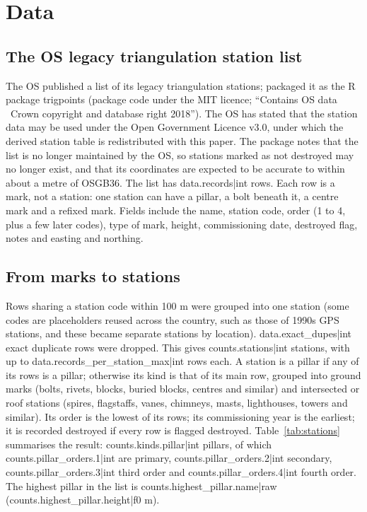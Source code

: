 \documentclass[11pt,a4paper]{article}
\begin{document}
\section{Data}\label{sec:data}
\subsection{The OS legacy triangulation station list}
The OS published a list of its legacy triangulation stations; \citet{jones2018} packaged it as the R package trigpoints (package code under the MIT licence; ``Contains OS data \textcopyright\ Crown copyright and database right 2018''). The OS has stated that the station data may be used under the Open Government Licence v3.0, under which the derived station table is redistributed with this paper. The package notes that the list is no longer maintained by the OS, so stations marked as not destroyed may no longer exist, and that its coordinates are expected to be accurate to within about a metre of OSGB36. The list has {{data.records|int}} rows. Each row is a mark, not a station: one station can have a pillar, a bolt beneath it, a centre mark and a refixed mark. Fields include the name, station code, order (1 to 4, plus a few later codes), type of mark, height, commissioning date, destroyed flag, notes and easting and northing.

\subsection{From marks to stations}
Rows sharing a station code within 100 m were grouped into one station (some codes are placeholders reused across the country, such as those of 1990s GPS stations, and these became separate stations by location). {{data.exact_dupes|int}} exact duplicate rows were dropped. This gives {{counts.stations|int}} stations, with up to {{data.records_per_station_max|int}} rows each. A station is a pillar if any of its rows is a pillar; otherwise its kind is that of its main row, grouped into ground marks (bolts, rivets, blocks, buried blocks, centres and similar) and intersected or roof stations (spires, flagstaffs, vanes, chimneys, masts, lighthouses, towers and similar). Its order is the lowest of its rows; its commissioning year is the earliest; it is recorded destroyed if every row is flagged destroyed. Table~\ref{tab:stations} summarises the result: {{counts.kinds.pillar|int}} pillars, of which {{counts.pillar_orders.1|int}} are primary, {{counts.pillar_orders.2|int}} secondary, {{counts.pillar_orders.3|int}} third order and {{counts.pillar_orders.4|int}} fourth order. The highest pillar in the list is {{counts.highest_pillar.name|raw}} ({{counts.highest_pillar.height|f0}} m).
\end{document}
